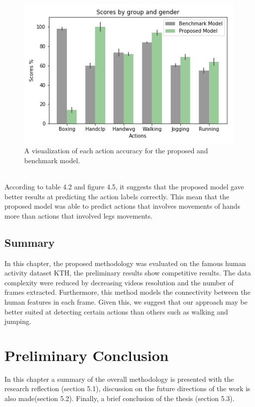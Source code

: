 \begin{figure}[ht]
    \centering
    \includegraphics{Figures/modelcomparison.png}
    \decoRule
    \caption [A visualization of each action accuracy for the proposed and benchmark model.]{A visualization of each action accuracy for the proposed and benchmark model.}
    \label{fig:la}
    \end{figure}\\
    \newpage
    According to table 4.2 and figure 4.5, it suggests that the proposed model gave better results at predicting the action labels correctly. This mean that the proposed model was able to predict actions that involves movements of hands more than actions that involved legs movements.
   

\section{Summary}
\hspace{5mm} In this chapter, the proposed methodology was evaluated on the famous human activity dataset KTH, the preliminary results show competitive results. The data complexity were reduced by decreasing videos resolution and the number of frames extracted. Furthermore, this method models the connectivity between the human features in each frame. Given this, we suggest that our approach may be better suited at detecting certain actions than others such as walking and jumping.
\chapter{Preliminary Conclusion}
\hspace{5mm} In this chapter a summary of the overall methodology is presented with the research reflection (section 5.1), discussion on the future directions of the work is also made(section 5.2). Finally, a brief conclusion of the thesis (section 5.3).
